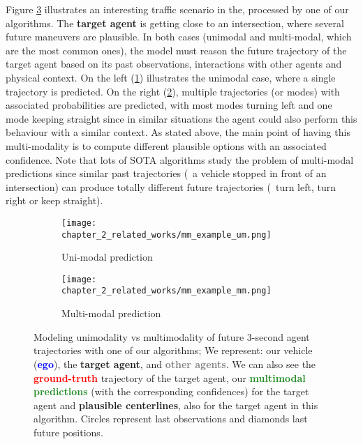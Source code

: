 Figure \ref{fig:chapter_2_related_works/um_vs_mm_mp} illustrates an interesting traffic scenario in the, processed by one of our algorithms. The \textbf{\textcolor{YellowOrange}{target agent}} is getting close to an intersection, where several future maneuvers are plausible. In both cases (unimodal and multi-modal, which are the most common ones), the model must reason the future trajectory of the target agent based on its past observations, interactions with other agents and physical context. On the left (\ref{subfig:chapter_2_related_works/um_vs_mm_mp_a}) illustrates the unimodal case, where a single trajectory is predicted. On the right (\ref{subfig:chapter_2_related_works/um_vs_mm_mp_b}), multiple trajectories (or modes) with associated probabilities are predicted, with most modes turning left and one mode keeping straight since in similar situations the agent could also perform this behaviour with a similar context. As stated above, the main point of having this multi-modality is to compute different plausible options with an associated confidence. Note that lots of \ac{SOTA} algorithms study the problem of multi-modal predictions since similar past trajectories (\eg \ a vehicle stopped in front of an intersection) can produce totally different future trajectories (\eg \ turn left, turn right or keep straight).

\begin{figure}[t!]
	\begin{subfigure}{0.5\textwidth}
		\texttt{[image: chapter\_2\_related\_works/mm\_example\_um.png]}
		\caption{Uni-modal prediction}
		\label{subfig:chapter_2_related_works/um_vs_mm_mp_a}
	\end{subfigure}
	\hfill
	\begin{subfigure}{0.5\textwidth}
		\texttt{[image: chapter\_2\_related\_works/mm\_example\_mm.png]}
		\caption{Multi-modal prediction}
		\label{subfig:chapter_2_related_works/um_vs_mm_mp_b}
	\end{subfigure}
	\captionsetup{justification=justified}
	\caption[Modeling uni-modality vs multi-modality of future $3$-second agent trajectories with one of our algorithms]{Modeling unimodality vs multimodality of future $3$-second agent trajectories with one of our algorithms; We represent: our vehicle (\textbf{\textcolor{blue}{ego}}), the \textbf{\textcolor{YellowOrange}{target agent}}, and \textbf{\textcolor{gray}{other agents}}. We can also see the \textbf{\textcolor{red}{ground-truth}} trajectory of the target agent, our \textbf{\textcolor{ForestGreen}{multimodal predictions}} (with the corresponding confidences) for the target agent and \textbf{plausible centerlines}, also for the target agent in this algorithm. Circles represent last observations and diamonds last future positions.}
	\label{fig:chapter_2_related_works/um_vs_mm_mp}
\end{figure}

